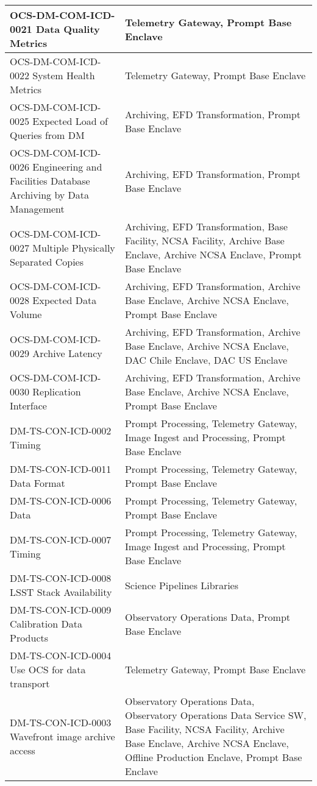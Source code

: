 \begin{longtable}{p{}p{}}
OCS-DM-COM-ICD-0021 Data Quality Metrics & Telemetry Gateway, Prompt Base Enclave \\ \hline
OCS-DM-COM-ICD-0022 System Health Metrics & Telemetry Gateway, Prompt Base Enclave \\ \hline
OCS-DM-COM-ICD-0025 Expected Load of Queries from DM & Archiving, EFD Transformation, Prompt Base Enclave \\ \hline
OCS-DM-COM-ICD-0026 Engineering and Facilities Database Archiving by Data Management & Archiving, EFD Transformation, Prompt Base Enclave \\ \hline
OCS-DM-COM-ICD-0027 Multiple Physically Separated Copies & Archiving, EFD Transformation, Base Facility, NCSA Facility, Archive Base Enclave, Archive NCSA Enclave, Prompt Base Enclave \\ \hline
OCS-DM-COM-ICD-0028 Expected Data Volume & Archiving, EFD Transformation, Archive Base Enclave, Archive NCSA Enclave, Prompt Base Enclave \\ \hline
OCS-DM-COM-ICD-0029 Archive Latency & Archiving, EFD Transformation, Archive Base Enclave, Archive NCSA Enclave, DAC Chile Enclave, DAC US Enclave \\ \hline
OCS-DM-COM-ICD-0030 Replication Interface & Archiving, EFD Transformation, Archive Base Enclave, Archive NCSA Enclave, Prompt Base Enclave \\ \hline
DM-TS-CON-ICD-0002 Timing & Prompt Processing, Telemetry Gateway, Image Ingest and Processing, Prompt Base Enclave \\ \hline
DM-TS-CON-ICD-0011 Data Format & Prompt Processing, Telemetry Gateway, Prompt Base Enclave \\ \hline
DM-TS-CON-ICD-0006 Data & Prompt Processing, Telemetry Gateway, Prompt Base Enclave \\ \hline
DM-TS-CON-ICD-0007 Timing & Prompt Processing, Telemetry Gateway, Image Ingest and Processing, Prompt Base Enclave \\ \hline
DM-TS-CON-ICD-0008 LSST Stack Availability & Science Pipelines Libraries \\ \hline
DM-TS-CON-ICD-0009 Calibration Data Products & Observatory Operations Data, Prompt Base Enclave \\ \hline
DM-TS-CON-ICD-0004 Use OCS for data transport & Telemetry Gateway, Prompt Base Enclave \\ \hline
DM-TS-CON-ICD-0003 Wavefront image archive access & Observatory Operations Data, Observatory Operations Data Service SW, Base Facility, NCSA Facility, Archive Base Enclave, Archive NCSA Enclave, Offline Production Enclave, Prompt Base Enclave \\ \hline

\end{longtable}
